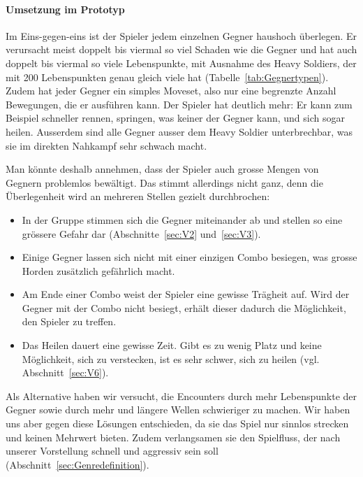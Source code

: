 \documentclass[../Main.tex]{subfiles}
\begin{document}
\paragraph{Umsetzung im Prototyp}
Im Eins-gegen-eins ist der Spieler jedem einzelnen Gegner haushoch überlegen. Er verursacht meist doppelt bis viermal so viel Schaden wie die Gegner und hat auch doppelt bis viermal so viele Lebenspunkte, mit Ausnahme des Heavy Soldiers, der mit 200 Lebenspunkten genau gleich viele hat (Tabelle~\ref{tab:Gegnertypen}). Zudem hat jeder Gegner ein simples Moveset, also nur eine begrenzte Anzahl Bewegungen, die er ausführen kann. Der Spieler hat deutlich mehr: Er kann zum Beispiel schneller rennen, springen, was keiner der Gegner kann, und sich sogar heilen. Ausserdem sind alle Gegner ausser dem Heavy Soldier unterbrechbar, was sie im direkten Nahkampf sehr schwach macht.

Man könnte deshalb annehmen, dass der Spieler auch grosse Mengen von Gegnern problemlos bewältigt. Das stimmt allerdings nicht ganz, denn die Überlegenheit wird an mehreren Stellen gezielt durchbrochen:

\begin{itemize}[leftmargin=1.5cm]
    \item In der Gruppe stimmen sich die Gegner miteinander ab und stellen so eine grössere Gefahr dar (Abschnitte~\ref{sec:V2} und~\ref{sec:V3}).
    \item Einige Gegner lassen sich nicht mit einer einzigen Combo besiegen, was grosse Horden zusätzlich gefährlich macht.
    \item Am Ende einer Combo weist der Spieler eine gewisse Trägheit auf. Wird der Gegner mit der Combo nicht besiegt, erhält dieser dadurch die Möglichkeit, den Spieler zu treffen.
    \item Das Heilen dauert eine gewisse Zeit. Gibt es zu wenig Platz und keine Möglichkeit, sich zu verstecken, ist es sehr schwer, sich zu heilen (vgl. Abschnitt~\ref{sec:V6}).
\end{itemize}

Als Alternative haben wir versucht, die Encounters durch mehr Lebenspunkte der Gegner sowie durch mehr und längere Wellen schwieriger zu machen. Wir haben uns aber gegen diese Lösungen entschieden, da sie das Spiel nur sinnlos strecken und keinen Mehrwert bieten. Zudem verlangsamen sie den Spielfluss, der nach unserer Vorstellung schnell und aggressiv sein soll (Abschnitt~\ref{sec:Genredefinition}).
\end{document}
